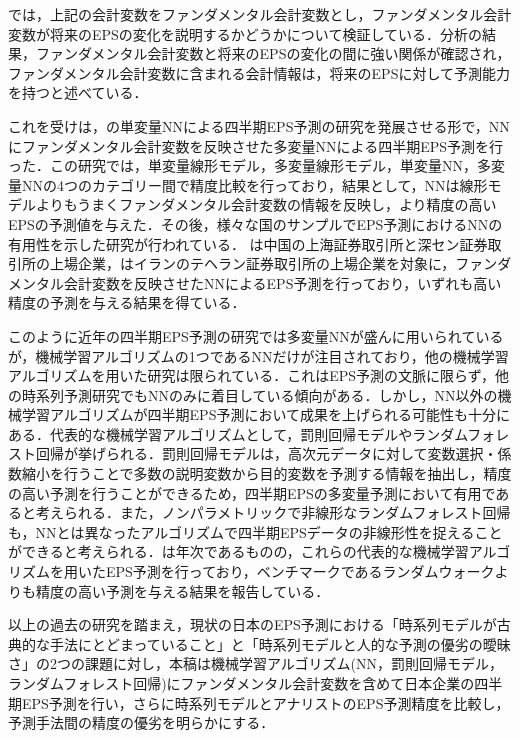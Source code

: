 \documentclass[a4paper，12pt]{jsarticle}
\begin{document}
\cite*{abarbanell1997fundamental}では，上記の会計変数をファンダメンタル会計変数とし，ファンダメンタル会計変数が将来のEPSの変化を説明するかどうかについて検証している．分析の結果，ファンダメンタル会計変数と将来のEPSの変化の間に強い関係が確認され，ファンダメンタル会計変数に含まれる会計情報は，将来のEPSに対して予測能力を持つと述べている．

これを受け\cite{zhang2004neural}は，\cite{callen1996neural}の単変量NNによる四半期EPS予測の研究を発展させる形で，NNにファンダメンタル会計変数を反映させた多変量NNによる四半期EPS予測を行った．この研究では，単変量線形モデル，多変量線形モデル，単変量NN，多変量NNの4つのカテゴリー間で精度比較を行っており，結果として，NNは線形モデルよりもうまくファンダメンタル会計変数の情報を反映し，より精度の高いEPSの予測値を与えた．その後，様々な国のサンプルでEPS予測におけるNNの有用性を示した研究が行われている．\cite*{cao2009forecasting} は中国の上海証券取引所と深セン証券取引所の上場企業，\cite{etemadi2015earnings}はイランのテヘラン証券取引所の上場企業を対象に，ファンダメンタル会計変数を反映させたNNによるEPS予測を行っており，いずれも高い精度の予測を与える結果を得ている．

このように近年の四半期EPS予測の研究では多変量NNが盛んに用いられているが，機械学習アルゴリズムの1つであるNNだけが注目されており，他の機械学習アルゴリズムを用いた研究は限られている．これはEPS予測の文脈に限らず，他の時系列予測研究でもNNのみに着目している傾向がある\citep{ahmed2010empirical}．しかし，NN以外の機械学習アルゴリズムが四半期EPS予測において成果を上げられる可能性も十分にある．代表的な機械学習アルゴリズムとして，罰則回帰モデルやランダムフォレスト回帰が挙げられる\citep{hastie2009esl}．罰則回帰モデルは，高次元データに対して変数選択・係数縮小を行うことで多数の説明変数から目的変数を予測する情報を抽出し，精度の高い予測を行うことができるため，四半期EPSの多変量予測において有用であると考えられる．また，ノンパラメトリックで非線形なランダムフォレスト回帰\citep{breiman2001random}も，NNとは異なったアルゴリズムで四半期EPSデータの非線形性を捉えることができると考えられる．\cite*{cao2020fundamental}は年次であるものの，これらの代表的な機械学習アルゴリズムを用いたEPS予測を行っており，ベンチマークであるランダムウォークよりも精度の高い予測を与える結果を報告している．

以上の過去の研究を踏まえ，現状の日本のEPS予測における「時系列モデルが古典的な手法にとどまっていること」と「時系列モデルと人的な予測の優劣の曖昧さ」の2つの課題に対し，本稿は機械学習アルゴリズム(NN，罰則回帰モデル，ランダムフォレスト回帰)にファンダメンタル会計変数を含めて日本企業の四半期EPS予測を行い，さらに時系列モデルとアナリストのEPS予測精度を比較し，予測手法間の精度の優劣を明らかにする．
\end{document}
